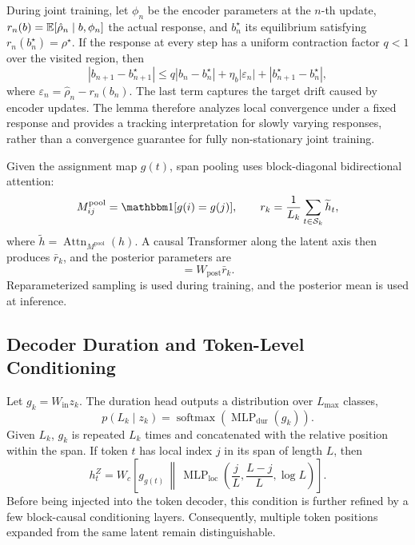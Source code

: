 During joint training, let $\phi_n$ be the encoder parameters at the $n$-th update, $r_n(b)=\mathbb{E}[\hat\rho_n\mid b,\phi_n]$ the actual response, and $b_n^\star$ its equilibrium satisfying $r_n(b_n^\star)=\rho^\star$. If the response at every step has a uniform contraction factor $q<1$ over the visited region, then
\begin{equation}
    |b_{n+1}-b_{n+1}^\star|
    \le q|b_n-b_n^\star|
       +\eta_b|\varepsilon_n|
       +|b_{n+1}^\star-b_n^\star|,
    \label{eq:app-rate-tracking}
\end{equation}
where $\varepsilon_n=\hat\rho_n-r_n(b_n)$. The last term captures the target drift caused by encoder updates. The lemma therefore analyzes local convergence under a fixed response and provides a tracking interpretation for slowly varying responses, rather than a convergence guarantee for fully non-stationary joint training.

Given the assignment map $g(t)$, span pooling uses block-diagonal bidirectional attention:
\begin{equation}
    M^{\mathrm{pool}}_{ij}=\ind[g(i)=g(j)],
    \qquad
    r_k=\frac{1}{L_k}\sum_{t\in\mathcal S_k}\widetilde h_t,
    \label{eq:app-workflow-pool}
\end{equation}
where $\widetilde h=\operatorname{Attn}_{M^{\mathrm{pool}}}(h)$. A causal Transformer along the latent axis then produces $\bar r_k$, and the posterior parameters are
\begin{equation}
    [\mu_k,\log\sigma_k^2]=W_{\mathrm{post}}\bar r_k.
    \label{eq:app-workflow-posterior-head}
\end{equation}
Reparameterized sampling is used during training, and the posterior mean is used at inference.

\subsection{Decoder Duration and Token-Level Conditioning}

Let $g_k=W_{\mathrm{in}}z_k$. The duration head outputs a distribution over $L_{\max}$ classes,
\begin{equation}
    p(L_k\mid z_k)=\operatorname{softmax}(\operatorname{MLP}_{\mathrm{dur}}(g_k)).
    \label{eq:app-workflow-duration}
\end{equation}
Given $L_k$, $g_k$ is repeated $L_k$ times and concatenated with the relative position within the span. If token $t$ has local index $j$ in its span of length $L$, then
\begin{equation}
    h_t^Z
    =W_c\!\left[
      g_{g(t)}\,\middle\|\,
      \operatorname{MLP}_{\mathrm{loc}}\!\left(
        \frac{j}{L},\frac{L-j}{L},\log L
      \right)
    \right].
    \label{eq:app-workflow-expander}
\end{equation}
Before being injected into the token decoder, this condition is further refined by a few block-causal conditioning layers. Consequently, multiple token positions expanded from the same latent remain distinguishable.

